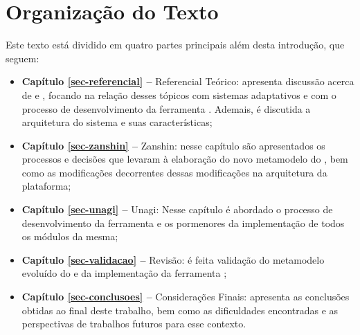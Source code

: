 

\section{Organização do Texto}
\label{sec-intro-organizacao}

Este texto está dividido em quatro partes principais além desta introdução, que seguem:

\begin{itemize}
	\item \textbf{Capítulo \ref{sec-referencial} --} Referencial Teórico: apresenta discussão acerca de \gore e \mdd, focando na relação desses tópicos com sistemas adaptativos e com o processo de desenvolvimento da ferramenta \unagi. Ademais, é discutida a arquitetura do sistema \zanshin e suas características;
	
	\item \textbf{Capítulo \ref{sec-zanshin} --} Zanshin: nesse capítulo são apresentados os processos e decisões que levaram à elaboração do novo metamodelo do \zanshin, bem como as modificações decorrentes dessas modificações na arquitetura da plataforma;
	
	\item \textbf{Capítulo \ref{sec-unagi} --} Unagi: Nesse capítulo é abordado o processo de desenvolvimento da ferramenta \unagi e os pormenores da implementação de todos os módulos da mesma;
	
	\item \textbf{Capítulo \ref{sec-validacao} --} Revisão: é feita validação do metamodelo evoluído do \zanshin e da implementação da ferramenta \unagi;
	
	\item \textbf{Capítulo \ref{sec-conclusoes} --} Considerações Finais: apresenta as conclusões obtidas ao final deste trabalho, bem como as dificuldades encontradas e as perspectivas de trabalhos futuros para esse contexto.
\end{itemize}










